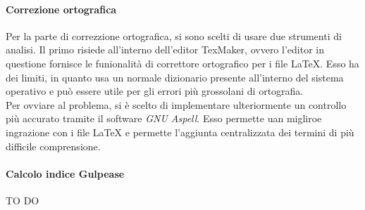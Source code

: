 			\paragraph{Correzione ortografica} %
			\label{par:correzione_ortografica}
			Per la parte di correzzione ortografica, si sono scelti di usare due strumenti di analisi. Il primo risiede all'interno dell'editor TexMaker, ovvero l'editor in questione fornisce le funionalità di correttore ortografico per i file \LaTeX{}. Esso ha dei limiti, in quanto usa un normale dizionario presente all'interno del sistema operativo e può essere utile per gli errori più grossolani di ortografia.\\
			Per ovviare al problema, si è scelto di implementare ulteriormente un controllo più accurato tramite il software \emph{GNU Aspell}. Esso permette uan migliroe ingrazione con i file \LaTeX{} e permette l'aggiunta centralizzata dei termini di più difficile comprensione.
			
			\paragraph{Calcolo indice Gulpease} %
			\label{par:calcolo_indice_gulpease}
			TO DO



